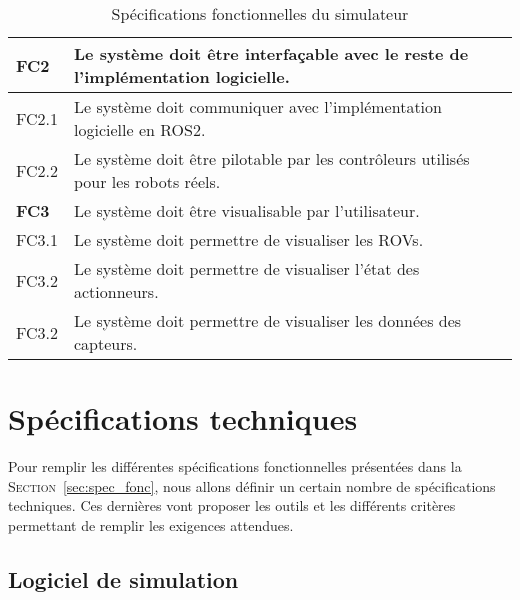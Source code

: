 \begin{table}[!htb]
\begin{adjustbox}{max width=\textwidth}
\begin{tabularx}{\textwidth}{|lX|}
                    \hline \hline
            
                    \cellcolor{orange!40}\textbf{FC2}&\cellcolor{orange!30} Le système doit être interfaçable avec le reste de l'implémentation logicielle. \\
                    \hline
                    \cellcolor{gray!10}FC2.1& Le système doit communiquer avec l'implémentation logicielle en \gls{ROS2}. \\
                    \hline
                    \cellcolor{gray!10}FC2.2& Le système doit être pilotable par les contrôleurs utilisés pour les robots réels. \\

                    \hline \hline
            
                    \cellcolor{orange!40}\textbf{FC3}&\cellcolor{orange!30} Le système doit être visualisable par l'utilisateur. \\
                    \hline
                    \cellcolor{gray!10}FC3.1& Le système doit permettre de visualiser les \gls{ROV}s. \\
                    \hline
                    \cellcolor{gray!10}FC3.2& Le système doit permettre de visualiser l'état des actionneurs.  \\
                    \hline
                    \cellcolor{gray!10}FC3.2& Le système doit permettre de visualiser les données des capteurs.  \\
                    \hline
                \end{tabularx}
            \end{adjustbox}
            \caption{Spécifications fonctionnelles du simulateur}
            \label{table:specs}
        \end{table}    

    \section{Spécifications techniques}

        Pour remplir les différentes spécifications fonctionnelles présentées dans la \textsc{Section}~\ref{sec:spec_fonc}, nous allons définir un certain nombre de spécifications techniques. Ces dernières vont proposer les outils et les différents critères permettant de remplir les exigences attendues.

        \subsection{Logiciel de simulation}

